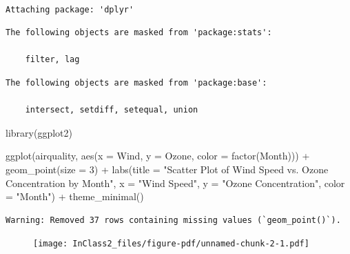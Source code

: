 \documentclass[
  letterpaper,
  DIV=11,
  numbers=noendperiod]{scrreprt}
\newenvironment{Shaded}{\begin{snugshade}}{\end{snugshade}}
\newcommand{\AttributeTok}[1]{\textcolor[rgb]{0.40,0.45,0.13}{#1}}
\newcommand{\DecValTok}[1]{\textcolor[rgb]{0.68,0.00,0.00}{#1}}
\newcommand{\FunctionTok}[1]{\textcolor[rgb]{0.28,0.35,0.67}{#1}}
\newcommand{\NormalTok}[1]{\textcolor[rgb]{0.00,0.23,0.31}{#1}}
\newcommand{\SpecialCharTok}[1]{\textcolor[rgb]{0.37,0.37,0.37}{#1}}
\newcommand{\StringTok}[1]{\textcolor[rgb]{0.13,0.47,0.30}{#1}}
\begin{document}
\begin{verbatim}

Attaching package: 'dplyr'
\end{verbatim}

\begin{verbatim}
The following objects are masked from 'package:stats':

    filter, lag
\end{verbatim}

\begin{verbatim}
The following objects are masked from 'package:base':

    intersect, setdiff, setequal, union
\end{verbatim}

\begin{Shaded}
\begin{Highlighting}[]
\FunctionTok{library}\NormalTok{(ggplot2)}
\end{Highlighting}
\end{Shaded}

\begin{Shaded}
\begin{Highlighting}[]
\FunctionTok{ggplot}\NormalTok{(airquality, }\FunctionTok{aes}\NormalTok{(}\AttributeTok{x =}\NormalTok{ Wind, }\AttributeTok{y =}\NormalTok{ Ozone, }\AttributeTok{color =} \FunctionTok{factor}\NormalTok{(Month))) }\SpecialCharTok{+}
  \FunctionTok{geom\_point}\NormalTok{(}\AttributeTok{size =} \DecValTok{3}\NormalTok{) }\SpecialCharTok{+}
  \FunctionTok{labs}\NormalTok{(}\AttributeTok{title =} \StringTok{"Scatter Plot of Wind Speed vs. Ozone Concentration by Month"}\NormalTok{,}
       \AttributeTok{x =} \StringTok{"Wind Speed"}\NormalTok{,}
       \AttributeTok{y =} \StringTok{"Ozone Concentration"}\NormalTok{,}
       \AttributeTok{color =} \StringTok{"Month"}\NormalTok{) }\SpecialCharTok{+}
  \FunctionTok{theme\_minimal}\NormalTok{()}
\end{Highlighting}
\end{Shaded}

\begin{verbatim}
Warning: Removed 37 rows containing missing values (`geom_point()`).
\end{verbatim}

\begin{figure}[H]

{\centering \texttt{[image: InClass2\_files/figure-pdf/unnamed-chunk-2-1.pdf]}

}

\end{figure}
\end{document}
